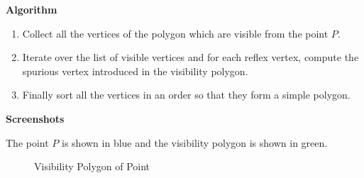 \documentclass[a4paper,10pt]{article}
\begin{document}
{\bf Algorithm}

\begin{enumerate}
 \item 
Collect all the vertices of the polygon which are visible from the point $P$.
\item
Iterate over the list of visible vertices and for each reflex vertex, compute the spurious vertex introduced in the visibility polygon.
\item
Finally sort all the vertices in an order so that they form a simple polygon.
\end{enumerate}

{\bf Screenshots}

The point $P$ is shown in blue and the visibility polygon is shown in green.

\begin{figure}[h]
\begin{center}
\caption{\label{fig:Visibility Polygon of Point}Visibility Polygon of Point}
\end{center}
\end{figure}
\end{document}
